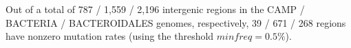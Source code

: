 Out of a total of 787 / 1,559 / 2,196 intergenic regions in the CAMP / BACTERIA / BACTEROIDALES genomes, respectively, 39 / 671 / 268 regions have nonzero mutation rates (using the threshold $minfreq=0.5\%$).\endinput